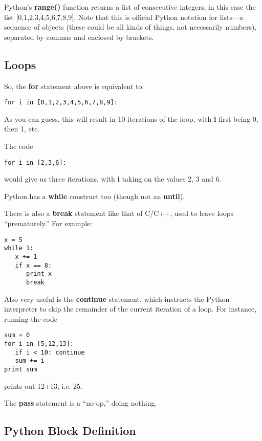 Python's {\bf range()} function returns a list of consecutive integers,
in this case the list [0,1,2,3,4,5,6,7,8,9].  Note that this is official
Python notation for lists---a sequence of objects (these could be all
kinds of things, not necessarily numbers), separated by commas and
enclosed by brackets.

\subsection{Loops}

So, the {\bf for} statement above is equivalent to:

\begin{Verbatim}[fontsize=\relsize{-2}]
for i in [0,1,2,3,4,5,6,7,8,9]:
\end{Verbatim}

As you can guess, this will result in 10 iterations of the loop, with
{\bf i} first being 0, then 1, etc.

The code

\begin{Verbatim}[fontsize=\relsize{-2}]
for i in [2,3,6]:
\end{Verbatim}

would give us three iterations, with {\bf i} taking on the values 2, 3
and 6.

Python has a {\bf while} construct too (though not an {\bf until}).

There is also a {\bf break} statement like that of C/C++, used to leave
loops ``prematurely.''  For example:

\begin{Verbatim}[fontsize=\relsize{-2}]
x = 5
while 1:
   x += 1
   if x == 8:
      print x
      break
\end{Verbatim}

Also very useful is the {\bf continue} statement, which instructs the
Python interpreter to skip the remainder of the current iteration of a
loop.  For instance, running the code

\begin{Verbatim}[fontsize=\relsize{-2}]
sum = 0
for i in [5,12,13]:
   if i < 10: continue
   sum += i
print sum
\end{Verbatim}

prints out 12+13, i.e. 25.

The {\bf pass} statement is a ``no-op,'' doing nothing.

\subsection{Python Block Definition} 

